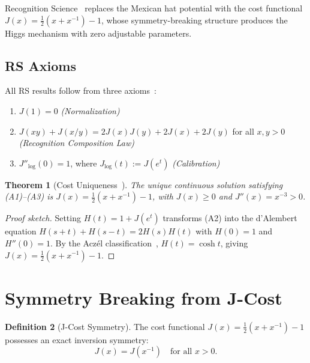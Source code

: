 \documentclass[12pt,a4paper]{article}
\newtheorem{theorem}{Theorem}[section]
\theoremstyle{definition}
\newtheorem{definition}[theorem]{Definition}
\theoremstyle{remark}
\begin{document}
Recognition Science~\cite{RS_Axioms} replaces the Mexican hat
potential with the cost functional
$J(x) = \tfrac{1}{2}(x + x^{-1}) - 1$, whose symmetry-breaking
structure produces the Higgs mechanism with zero adjustable
parameters.

\subsection{RS Axioms}

All RS results follow from three axioms~\cite{RS_Axioms}:
\begin{enumerate}[label=(A\arabic*),nosep]
  \item $J(1) = 0$ \hfill\textit{(Normalization)}
  \item $J(xy) + J(x/y) = 2J(x)J(y) + 2J(x) + 2J(y)$ for all $x, y > 0$
  \hfill\textit{(Recognition Composition Law)}
  \item $J''_{\log}(0) = 1$, where $J_{\log}(t) := J(e^t)$
  \hfill\textit{(Calibration)}
\end{enumerate}

\begin{theorem}[Cost Uniqueness~\cite{RS_Axioms}]
\label{thm:J}
The unique continuous solution satisfying (A1)--(A3) is
$J(x) = \tfrac{1}{2}(x + x^{-1}) - 1$, with $J(x) \geq 0$
and $J''(x) = x^{-3} > 0$.
\end{theorem}

\begin{proof}[Proof sketch]
Setting $H(t) = 1 + J(e^t)$ transforms (A2) into the d'Alembert
equation $H(s+t)+H(s-t)=2H(s)H(t)$ with $H(0)=1$ and
$H''(0)=1$.  By the Acz\'el classification~\cite{Aczel1966},
$H(t) = \cosh t$, giving $J(x) = \tfrac{1}{2}(x+x^{-1})-1$.
\end{proof}

\section{Symmetry Breaking from J-Cost}
\label{sec:ssb}

\begin{definition}[J-Cost Symmetry]
The cost functional $J(x) = \tfrac{1}{2}(x + x^{-1}) - 1$
possesses an exact inversion symmetry:
\begin{equation}
  J(x) = J(x^{-1}) \quad \text{for all } x > 0.
\end{equation}
\end{definition}
\end{document}
